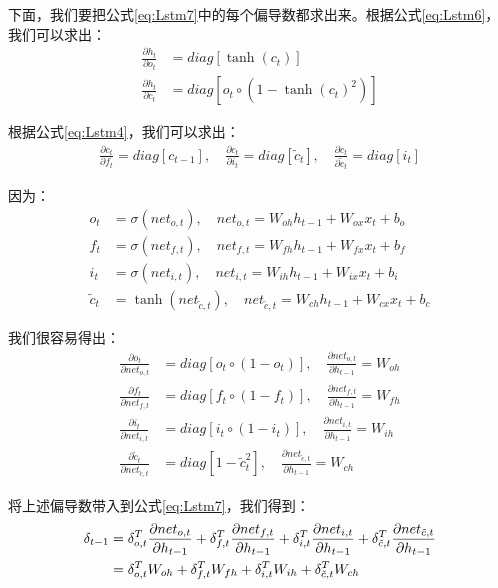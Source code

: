下面，我们要把公式\ref{eq:Lstm7}中的每个偏导数都求出来。根据公式\ref{eq:Lstm6}，我们可以求出：
\begin{align*}
	\frac{\partial{{h_t}}}{\partial{{o}_t}} & =diag[\tanh({c}_t)]                 \\
	\frac{\partial{{h_t}}}{\partial{{c}_t}} & =diag[{o}_t\circ(1-\tanh({c}_t)^2)]
\end{align*}

根据公式\ref{eq:Lstm4}，我们可以求出：
\begin{align*}
	\frac{\partial{{c}_t}}{\partial{{f_{t}}}}=diag[{c}_{t-1}],\quad
	\frac{\partial{{c}_t}}{\partial{{i_{t}}}}=diag[{\tilde{c}}_t],\quad
	\frac{\partial{{c}_t}}{\partial{{\tilde{c}_{t}}}}=diag[{i}_t]
\end{align*}

因为：
\begin{align*}
	{o}_t         & =\sigma({net}_{o,t}),\quad {net}_{o,t}=W_{oh}{h}_{t-1}+W_{ox}{x}_t+{b}_o                \\
	{f}_t         & =\sigma({net}_{f,t}),\quad {net}_{f,t}=W_{fh}{h}_{t-1}+W_{fx}{x}_t+{b}_f                \\
	{i}_t         & =\sigma({net}_{i,t}),\quad {net}_{i,t}=W_{ih}{h}_{t-1}+W_{ix}{x}_t+{b}_i                \\
	{\tilde{c}}_t & =\tanh({net}_{\tilde{c},t}),\quad {net}_{\tilde{c},t}=W_{ch}{h}_{t-1}+W_{cx}{x}_t+{b}_c
\end{align*}

我们很容易得出：
\begin{align*}
	\frac{\partial{{o}_t}}{\partial{{net}_{o,t}}}                 & =diag[{o}_t\circ(1-{o}_t)],\quad \frac{\partial{{net}_{o,t}}}{\partial{{h_{t-1}}}}=W_{oh}       \\
	\frac{\partial{{f}_t}}{\partial{{net}_{f,t}}}                 & =diag[{f}_t\circ(1-{f}_t)],\quad \frac{\partial{{net}_{f,t}}}{\partial{{h}_{t-1}}}=W_{fh}       \\
	\frac{\partial{{i}_t}}{\partial{{net}_{i,t}}}                 & =diag[{i}_t\circ(1-{i}_t)],\quad \frac{\partial{{net}_{i,t}}}{\partial{{h}_{t-1}}}=W_{ih}       \\
	\frac{\partial{{\tilde{c}}_t}}{\partial{{net}_{\tilde{c},t}}} & =diag[1-{\tilde{c}}_t^2],\quad \frac{\partial{{net}_{\tilde{c},t}}}{\partial{{h}_{t-1}}}=W_{ch}
\end{align*}

将上述偏导数带入到公式\ref{eq:Lstm7}，我们得到：
\begin{align}
	\delta_{t-1} & =\delta_{o,t}^T\frac{\partial{{net}_{o,t}}}{\partial{{h_{t-1}}}}
	+\delta_{f,t}^T\frac{\partial{{net}_{f,t}}}{\partial{{h_{t-1}}}}
	+\delta_{i,t}^T\frac{\partial{{net}_{i,t}}}{\partial{{h_{t-1}}}}
	+\delta_{\tilde{c},t}^T\frac{\partial{{net}_{\tilde{c},t}}}{\partial{{h_{t-1}}}}\notag \\
	             & =\delta_{o,t}^T W_{oh}
	+\delta_{f,t}^TW_{fh}
	+\delta_{i,t}^TW_{ih}
	+\delta_{\tilde{c},t}^TW_{ch}\label{eq:Lstm8}
\end{align}

